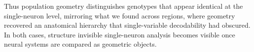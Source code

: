 Thus population geometry distinguishes genotypes that appear identical at the single-neuron level, mirroring what we found across regions, where geometry recovered an anatomical hierarchy that single-variable decodability had obscured. In both cases, structure invisible single-neuron analysis becomes visible once neural systems are compared as geometric objects.


